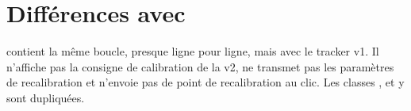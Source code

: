 \section{Différences avec \texorpdfstring{}{main.py}}

 contient la même boucle, presque ligne pour ligne, mais avec le tracker v1. Il n'affiche pas la consigne de calibration de la v2, ne transmet pas les paramètres de recalibration et n'envoie pas de point de recalibration au clic. Les classes ,  et  y sont dupliquées.
